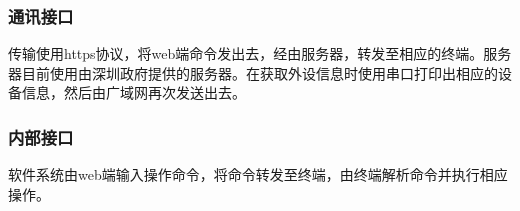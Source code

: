 \documentclass[UTF8]{ctexart}
\newcommand{\note}[1]{\textcolor{blue}{\emph{[#1]}}}   %
\begin{document}
    \subsubsection{通讯接口}
	 \par{传输使用https协议，将web端命令发出去，经由服务器，转发至相应的终端。服务器目前使用由深圳政府提供的服务器。在获取外设信息时使用串口打印出相应的设备信息，然后由广域网再次发送出去。}
    \subsubsection{内部接口}
	  \par{软件系统由web端输入操作命令，将命令转发至终端，由终端解析命令并执行相应操作。}
	  
	 \newpage
\end{document}
